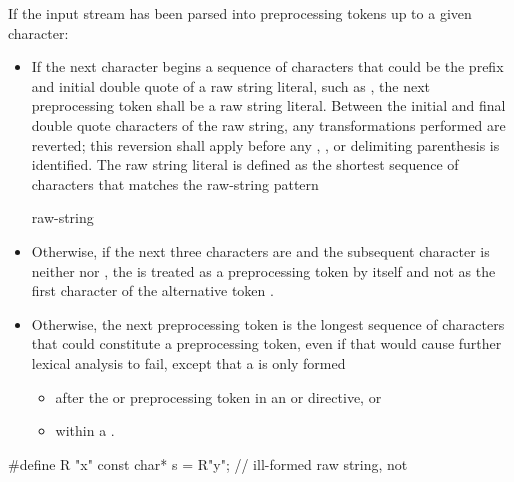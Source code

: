 \documentclass{wg21}
\begin{document}
\pnum
If the input stream has been parsed into preprocessing tokens up to a
given character:
\begin{itemize}
    \item
    If the next character begins a sequence of characters that could be the prefix
    and initial double quote of a raw string literal, such as , the next preprocessing
    token shall be a raw string literal. Between the initial and final
    double quote characters of the raw string, any transformations performed  are reverted; this reversion
    shall apply before any , , or delimiting
    parenthesis is identified. The raw string literal is defined as the shortest sequence
    of characters that matches the raw-string pattern
    \begin{ncbnf}
          raw-string
    \end{ncbnf}

    \item Otherwise, if the next three characters are \tcode{<::} and the subsequent character
    is neither \tcode{:} nor \tcode{>}, the \tcode{<} is treated as a preprocessing token by
    itself and not as the first character of the alternative token \tcode{<:}.

    \item Otherwise,
    the next preprocessing token is the longest sequence of
    characters that could constitute a preprocessing token, even if that
    would cause further lexical analysis to fail,
    except that a  is only formed
    \begin{itemize}
        \item
        after the  or  preprocessing token in an
         or
         directive, or

        \item
        within a .

    \end{itemize}
\end{itemize}

\begin{example}
    \begin{codeblock}
        #define R "x"
        const char* s = R"y";           // ill-formed raw string, not 
    \end{codeblock}
\end{example}
\end{document}
